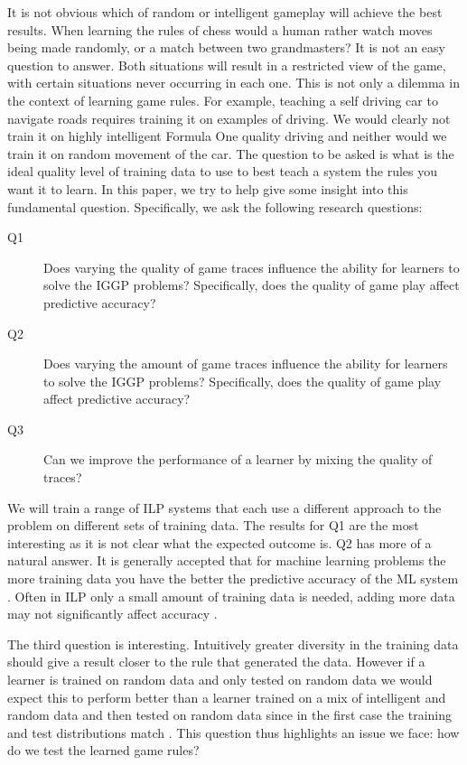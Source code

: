 It is not obvious which of random or intelligent gameplay will achieve the best results. When learning the rules of chess would a human rather watch moves being made randomly, or a match between two grandmasters? It is not an easy question to answer. Both situations will result in a restricted view of the game, with certain situations never occurring in each one. This is not only a dilemma in the context of learning game rules. For example, teaching a self driving car to navigate roads requires training it on examples of driving. We would clearly not train it on highly intelligent Formula One quality driving and neither would we train it on random movement of the car. The question to be asked is what is the ideal quality level of training data to use to best teach a system the rules you want it to learn. In this paper, we try to help give some insight into this fundamental question. Specifically, we ask the following research questions:

\begin{description}
\item[Q1] Does varying the quality of game traces influence the ability for learners to solve the IGGP problems? Specifically, does the quality of game play affect predictive accuracy?
\item[Q2] Does varying the amount of game traces influence the ability for learners to solve the IGGP problems? Specifically, does the quality of game play affect predictive accuracy?
\item[Q3] Can we improve the performance of a learner by mixing the quality of traces?
\end{description}

We will train a range of ILP systems that each use a different approach to the problem on different sets of training data. The results for Q1 are the most interesting as it is not clear what the expected outcome is. Q2 has more of a natural answer. It is generally accepted that for machine learning problems the more training data you have the better the predictive accuracy of the ML system \cite{Mitchell/MachineLearing}. Often in ILP only a small amount of training data is needed, adding more data may not significantly affect accuracy \cite{Muggleton/ILP}.

The third question is interesting. Intuitively greater diversity in the training data should give a result closer to the rule that generated the data. However if a learner is trained on random data and only tested on random data we would expect this to perform better than a learner trained on a mix of intelligent and random data and then tested on random data since in the first case the training and test distributions match \cite{Mitchell/MachineLearing}. This question thus highlights an issue we face: how do we test the learned game rules?

